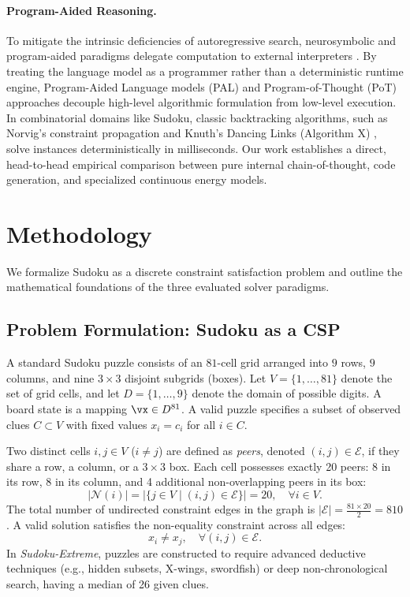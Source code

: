 \documentclass{article} %
\begin{document}
\paragraph{Program-Aided Reasoning.}
To mitigate the intrinsic deficiencies of autoregressive search, neurosymbolic and program-aided paradigms delegate computation to external interpreters \citep{gao2023pal,chen2022program}. By treating the language model as a programmer rather than a deterministic runtime engine, Program-Aided Language models (PAL) and Program-of-Thought (PoT) approaches decouple high-level algorithmic formulation from low-level execution. In combinatorial domains like Sudoku, classic backtracking algorithms, such as Norvig's constraint propagation \citep{norvig2006sudoku} and Knuth's Dancing Links (Algorithm X) \citep{knuth2000dancing}, solve instances deterministically in milliseconds. Our work establishes a direct, head-to-head empirical comparison between pure internal chain-of-thought, code generation, and specialized continuous energy models.

\section{Methodology}
\label{sec:method}

We formalize Sudoku as a discrete constraint satisfaction problem and outline the mathematical foundations of the three evaluated solver paradigms.

\subsection{Problem Formulation: Sudoku as a CSP}
A standard Sudoku puzzle consists of an $81$-cell grid arranged into $9$ rows, $9$ columns, and nine $3 \times 3$ disjoint subgrids (boxes). Let $V = \{1, \dots, 81\}$ denote the set of grid cells, and let $D = \{1, \dots, 9\}$ denote the domain of possible digits. A board state is a mapping $\vx \in D^{81}$. A valid puzzle specifies a subset of observed clues $C \subset V$ with fixed values $x_i = c_i$ for all $i \in C$.

Two distinct cells $i, j \in V$ ($i \neq j$) are defined as \textit{peers}, denoted $(i, j) \in \mathcal{E}$, if they share a row, a column, or a $3 \times 3$ box. Each cell possesses exactly 20 peers: 8 in its row, 8 in its column, and 4 additional non-overlapping peers in its box:
\begin{equation}
    |\mathcal{N}(i)| = |\{j \in V \mid (i, j) \in \mathcal{E}\}| = 20, \quad \forall i \in V.
\end{equation}
The total number of undirected constraint edges in the graph is $|\mathcal{E}| = \frac{81 \times 20}{2} = 810$. A valid solution satisfies the non-equality constraint across all edges:
\begin{equation}
    x_i \neq x_j, \quad \forall (i, j) \in \mathcal{E}.
\end{equation}
In \textit{Sudoku-Extreme}, puzzles are constructed to require advanced deductive techniques (e.g., hidden subsets, X-wings, swordfish) or deep non-chronological search, having a median of 26 given clues.
\end{document}
